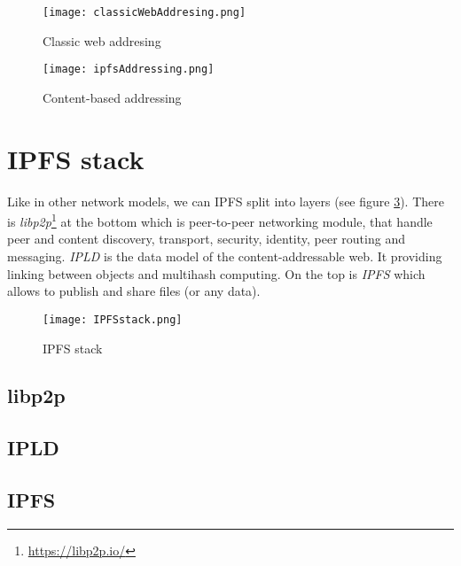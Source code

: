 \begin{figure}[h]
    \centering
    \texttt{[image: classicWebAddresing.png]}
    \caption{Classic web addresing}
    \label{webAddressing}
\end{figure}

\begin{figure}[h]
    \centering
    \texttt{[image: ipfsAddressing.png]}
    \caption{Content-based addressing}
    \label{ipfsAddressing}
\end{figure}

\section{IPFS stack}
Like in other network models, we can IPFS split into layers (see figure \ref{IPFSstack}). There is \textit{libp2p}\footnote{\url{https://libp2p.io/}} at the bottom which is peer-to-peer networking module, that handle peer and content discovery, transport, security, identity, peer routing and messaging. \textit{IPLD} is the data model of the content-addressable web. It providing linking between objects and multihash computing. On the top is \textit{IPFS} which allows to publish and share files (or any data).\cite{IPFSwhitepaper}


\begin{figure}[h]
    \centering
    \texttt{[image: IPFSstack.png]}
    \caption{IPFS stack}
    \label{IPFSstack}
\end{figure}


\subsection{libp2p}
\subsection{IPLD}
\subsection{IPFS}



